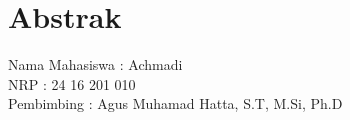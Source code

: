 \documentclass[12pt]{article}
\date{}
\begin{document}
	
	
	\setcounter{page}{2}
	
	\section{Abstrak}
	
	\begin{center}
	\end{center}

	\vspace{10pt}
	
	\begin{flushleft}
		\hspace{150pt} Nama Mahasiswa : Achmadi \\
		\hspace{150pt} NRP \hspace{62pt}: 24 16 201 010 \\
		\hspace{150pt} Pembimbing \hspace{24pt}: Agus Muhamad Hatta, S.T, M.Si, Ph.D \\
	\end{flushleft}
	
	\vspace{10pt}
\end{document}
